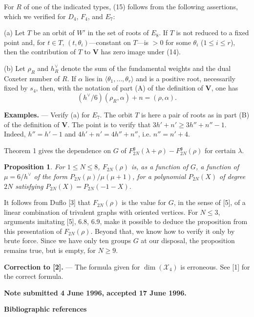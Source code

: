 \documentclass[11pt,a4paper]{article}
\theoremstyle{plain}
\newtheorem{proposition}[theorem]{Proposition}
\theoremstyle{definition}
\begin{document}
For $R$ of one of the indicated types, (15) follows from the following assertions, which we verified for $D_4$, $F_4$, and $E_7$:

\smallskip
\noindent(a) Let $T$ be an orbit of $W'$ in the set of roots of $E_8$. If $T$ is not reduced to a fixed point and, for $t\in T$, $(t,\theta_i)$---constant on $T$---is $>0$ for some $\theta_i$ ($1\leq i\leq r$), then the contribution of $T$ to $\mathbf V$ has zero image under (14).

\smallskip
\noindent(b) Let $\rho_R$ and $h_R^\vee$ denote the sum of the fundamental weights and the dual Coxeter number of $R$. If $\alpha$ lies in $\langle\theta_1,\ldots,\theta_r\rangle$ and is a positive root, necessarily fixed by $s_4$, then, with the notation of part (A) of the definition of $\mathbf V$, one has
\[
(h^\vee/6)(\rho_R,\alpha)+n=(\rho,\alpha).
\]

\smallskip
\textbf{Examples.} --- Verify (a) for $E_7$. The orbit $T$ is here a pair of roots as in part (B) of the definition of $\mathbf V$. The point is to verify that $3h'+n'\geq 3h''+n''-1$. Indeed, $h''=h'-1$ and $4h'+n'=4h''+n''$, i.e. $n''=n'+4$.

\smallskip
Theorem 1 gives the dependence on $G$ of $F_{2N}^{\mathfrak g}(\lambda+\rho)-F_{2N}^{\mathfrak g}(\rho)$ for certain $\lambda$.

\begin{proposition}\label{prop:2}
For $1\leq N\leq8$, $F_{2N}(\rho)$ is, as a function of $G$, a function of $\mu=6/h^\vee$ of the form $P_{2N}(\mu)/\mu(\mu+1)$, for a polynomial $P_{2N}(X)$ of degree $2N$ satisfying $P_{2N}(X)=P_{2N}(-1-X)$.
\end{proposition}

It follows from Duflo [3] that $F_{2N}(\rho)$ is the value for $G$, in the sense of [5], of a linear combination of trivalent graphs with oriented vertices. For $N\leq3$, arguments imitating [5], 6.8, 6.9, make it possible to deduce the proposition from this presentation of $F_{2N}(\rho)$. Beyond that, we know how to verify it only by brute force. Since we have only ten groups $G$ at our disposal, the proposition remains true, but is empty, for $N\geq9$.

\bigskip
\textbf{Correction to [2].} --- The formula given for $\dim(\mathcal X_4)$ is erroneous. See [1] for the correct formula.

\bigskip
\noindent\textbf{Note submitted 4 June 1996, accepted 17 June 1996.}

\bigskip
\begin{center}
\textbf{Bibliographic references}
\end{center}
\end{document}
